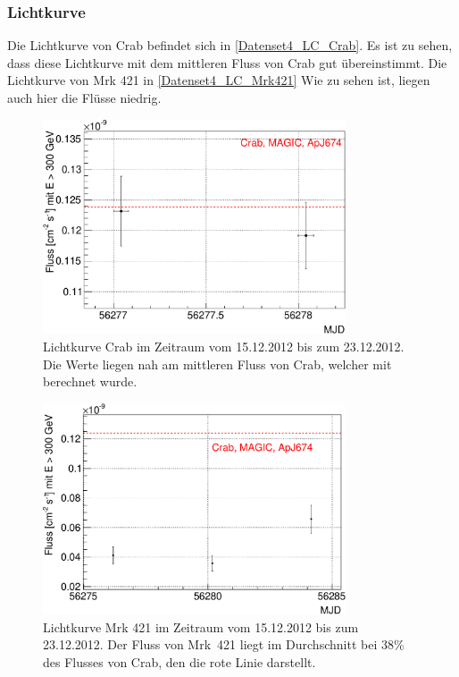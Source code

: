 \subsubsection{Lichtkurve}
Die Lichtkurve von Crab befindet sich in \autoref{Datenset4_LC_Crab}. 
Es ist zu sehen, dass diese Lichtkurve mit dem mittleren Fluss von Crab gut übereinstimmt.
Die Lichtkurve von Mrk 421 in \autoref{Datenset4_LC_Mrk421} 
Wie zu sehen ist, liegen auch hier die Flüsse niedrig.

\begin{figure}
    \centering
    \includegraphics[width=0.8\textwidth]{./Plots/04_MrkAnalyse/Datenset4/Datenset4_LC_Crab.pdf}
    \caption{Lichtkurve Crab im Zeitraum vom 15.12.2012 bis zum 23.12.2012.
    Die Werte liegen nah am mittleren Fluss von Crab, welcher mit \cite{LiteraturreferenzMAGIC} berechnet wurde.}
    \label{Datenset4_LC_Crab}
\end{figure}

\begin{figure}
    \centering
    \includegraphics[width=0.8\textwidth]{./Plots/04_MrkAnalyse/Datenset4/Datenset4_LC_Mrk421.pdf}
    \caption{Lichtkurve Mrk 421 im Zeitraum vom 15.12.2012 bis zum 23.12.2012.
    Der Fluss von Mrk~421 liegt im Durchschnitt bei 38\% des Flusses von Crab, den die rote Linie darstellt.}
    \label{Datenset4_LC_Mrk421}
\end{figure}


